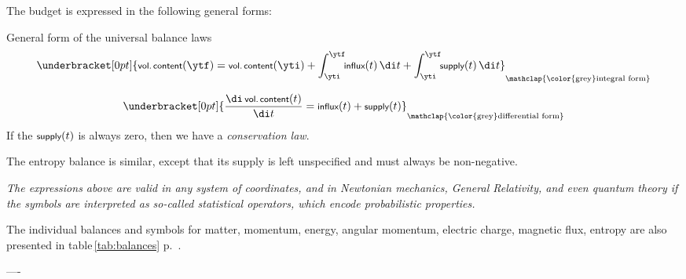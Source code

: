 The budget is expressed in the following general forms:
\begin{definition}{General form of the universal balance laws}
  \begin{equation*}
    \begin{gathered}[t]
      \underbracket[0pt]{\textsf{\footnotesize vol.\,content}(\ytf) = \textsf{\footnotesize vol.\,content}(\yti) + \int_{\yti}^{\ytf}\!\!\textsf{\footnotesize influx}(t)\,\di t + \int_{\yti}^{\ytf}\!\!\textsf{\footnotesize supply}(t)\,\di t}_{\mathclap{\text{\color{grey}integral form}}}
      \\[2\jot]
      \underbracket[0pt]{\frac{\di\,\textsf{\footnotesize vol.\,content}(t)}{\di t} = \textsf{\footnotesize influx}(t) + \textsf{\footnotesize supply}(t)}_{\mathclap{\text{\color{grey}differential form}}}
    \end{gathered}
  \end{equation*}
  If the $\textsf{\footnotesize supply}(t)$ is always zero, then we have a \emph{conservation law}.

  \medskip

    The entropy balance is similar, except that its supply is left unspecified and must always be non-negative.

      \medskip

  \emph{The expressions above are valid in any system of coordinates, and in Newtonian mechanics, General Relativity, and even quantum theory if the symbols are interpreted as so-called statistical operators, which encode probabilistic properties.}
\end{definition}

The individual balances and symbols for matter, momentum, energy, angular momentum, electric charge, magnetic flux, entropy are also presented in table\,\ref{tab:balances} p.~\pageref{tab:balances}.


----











